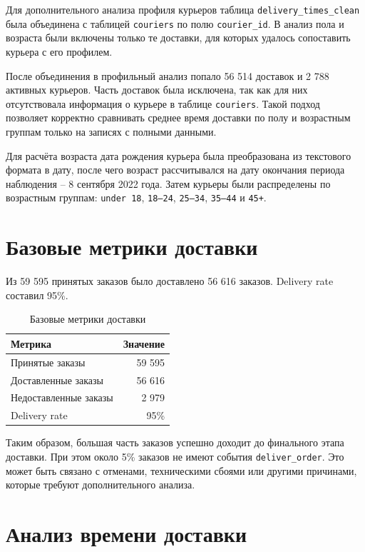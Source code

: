 \documentclass[12pt,a4paper]{article}
\begin{document}
Для дополнительного анализа профиля курьеров таблица \texttt{delivery\_times\_clean} была объединена с таблицей \texttt{couriers} по полю \texttt{courier\_id}. В анализ пола и возраста были включены только те доставки, для которых удалось сопоставить курьера с его профилем.

После объединения в профильный анализ попало 56 514 доставок и 2 788 активных курьеров. Часть доставок была исключена, так как для них отсутствовала информация о курьере в таблице \texttt{couriers}. Такой подход позволяет корректно сравнивать среднее время доставки по полу и возрастным группам только на записях с полными данными.

Для расчёта возраста дата рождения курьера была преобразована из текстового формата в дату, после чего возраст рассчитывался на дату окончания периода наблюдения -- 8 сентября 2022 года. Затем курьеры были распределены по возрастным группам: \texttt{under 18}, \texttt{18--24}, \texttt{25--34}, \texttt{35--44} и \texttt{45+}.

\newpage
\section{Базовые метрики доставки}

Из 59 595 принятых заказов было доставлено 56 616 заказов. Delivery rate составил 95\%.

\begin{table}[H]
\centering
\caption{Базовые метрики доставки}
\begin{tabular}{lr}
\toprule
\textbf{Метрика} & \textbf{Значение} \\
\midrule
Принятые заказы & 59 595 \\
Доставленные заказы & 56 616 \\
Недоставленные заказы & 2 979 \\
Delivery rate & 95\% \\
\bottomrule
\end{tabular}
\end{table}

Таким образом, большая часть заказов успешно доходит до финального этапа доставки. При этом около 5\% заказов не имеют события \texttt{deliver\_order}. Это может быть связано с отменами, техническими сбоями или другими причинами, которые требуют дополнительного анализа.

\section{Анализ времени доставки}
\end{document}
